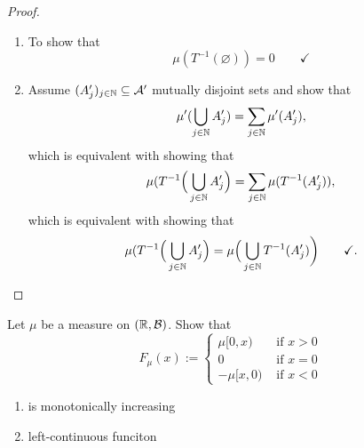 \begin{proof}

\begin{enumerate}
  \item To show that
\[
\mu (T^{-1}(\varnothing ))=0 \qquad \checkmark
\]
  \item Assume \((A_{j}')_{j\in \Bbb{N}}\subseteq \mathcal{A}'\) mutually disjoint sets and show that
\[
\mu '(\bigcup _{j\in \Bbb{N}}A_{j}')=\sum _{j\in \Bbb{N}}\mu '(A_{j}'),
\]
which is equivalent with showing that
\[
\mu (T^{-1}\Big(\bigcup _{j\in \Bbb{N}}A_{j}'\Big)=\sum _{j\in \Bbb{N}}\mu (T^{-1}(A_{j}')),
\]
which is equivalent with showing that
\[
\mu (T^{-1}\Big(\bigcup _{j\in \Bbb{N}}A_{j}'\Big)=\mu \Big(\bigcup _{j\in \Bbb{N}}T^{-1}(A_{j}')\bigg) \qquad \checkmark.
\]
\end{enumerate}

\end{proof}
\begin{thm}[Problem 7.9i]
Let \(\mu \) be a measure on \((\Bbb{R},\mathcal{B})\). Show that
\[
F_\mu (x):=\begin{cases}\mu [0,x) &\text{ if }x>0 \\0 & \text{ if }x=0 \\ -\mu [x,0) &\text{ if }x<0\end{cases}
\]

\begin{enumerate}
  \item is monotonically increasing
  \item left-continuous funciton
\end{enumerate}
\end{thm}


